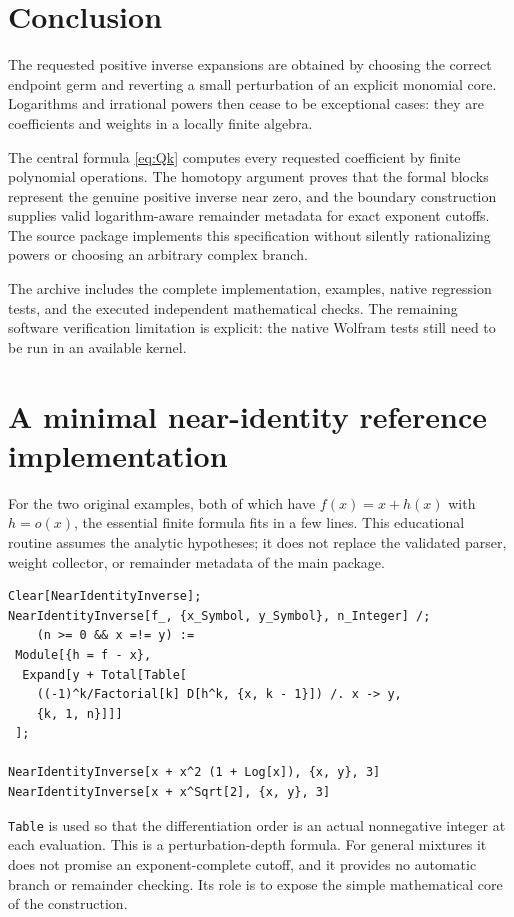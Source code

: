 \documentclass[11pt,a4paper]{article}
\theoremstyle{definition}
\theoremstyle{remark}
\newcommand{\code}[1]{\texttt{#1}}
\begin{document}
\section{Conclusion}

The requested positive inverse expansions are obtained by choosing the
correct endpoint germ and reverting a small perturbation of an explicit
monomial core. Logarithms and irrational powers then cease to be exceptional
cases: they are coefficients and weights in a locally finite algebra.

The central formula \eqref{eq:Qk} computes every requested coefficient by
finite polynomial operations. The homotopy argument proves that the formal
blocks represent the genuine positive inverse near zero, and the boundary
construction supplies valid logarithm-aware remainder metadata for exact
exponent cutoffs. The source package implements this specification without
silently rationalizing powers or choosing an arbitrary complex branch.

The archive includes the complete implementation, examples, native regression
tests, and the executed independent mathematical checks. The remaining
software verification limitation is explicit: the native Wolfram tests still
need to be run in an available kernel.

\appendix
\section{A minimal near-identity reference implementation}
\label{app:minimal}

For the two original examples, both of which have $f(x)=x+h(x)$ with $h=o(x)$,
the essential finite formula fits in a few lines. This educational routine
assumes the analytic hypotheses; it does not replace the validated parser,
weight collector, or remainder metadata of the main package.

\begin{lstlisting}
Clear[NearIdentityInverse];
NearIdentityInverse[f_, {x_Symbol, y_Symbol}, n_Integer] /;
    (n >= 0 && x =!= y) :=
 Module[{h = f - x},
  Expand[y + Total[Table[
    ((-1)^k/Factorial[k] D[h^k, {x, k - 1}]) /. x -> y,
    {k, 1, n}]]]
 ];

NearIdentityInverse[x + x^2 (1 + Log[x]), {x, y}, 3]
NearIdentityInverse[x + x^Sqrt[2], {x, y}, 3]
\end{lstlisting}
\code{Table} is used so that the differentiation order is an actual
nonnegative integer at each evaluation. This is a perturbation-depth formula.
For general mixtures it does not promise an exponent-complete cutoff, and it
provides no automatic branch or remainder checking. Its role is to expose the
simple mathematical core of the construction.
\end{document}
